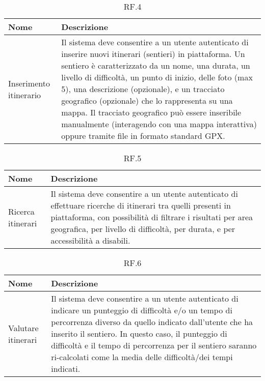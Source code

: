\documentclass{natourDoc}
\begin{document}
	\begin{table}[H]
		\centering
		\begin{tabular}{ |p{5cm}|p{10.3cm}| } 
			\hline
			\rowcolor{PineGreen!70}
			\textbf{Nome} & \textbf{Descrizione} \\
			\hline
			Inserimento itinerario &  Il sistema deve consentire a un utente autenticato di inserire nuovi itinerari (sentieri) in piattaforma. Un sentiero è
			caratterizzato da un nome, una durata, un livello di difficoltà, un punto di inizio, delle foto (max 5), una descrizione
			(opzionale), e un tracciato geografico (opzionale) che lo rappresenta su una mappa. Il tracciato
			geografico può essere inseribile manualmente (interagendo con una mappa interattiva) oppure
			tramite file in formato standard GPX.\\ 
			\hline
		\end{tabular}
		\caption{RF.4}
		\label{table:4}
	\end{table}
	
	\begin{table}[H]
		\centering
		\begin{tabular}{ |p{5cm}|p{10.3cm}| } 
			\hline
			\rowcolor{PineGreen!70}
			\textbf{Nome} & \textbf{Descrizione} \\
			\hline
			Ricerca itinerari &  Il sistema deve consentire a un utente autenticato di effettuare ricerche di itinerari tra quelli presenti in piattaforma, con possibilità di filtrare i risultati
			per area geografica, per livello di difficoltà, per durata, e per accessibilità a disabili.\\ 
			\hline
		\end{tabular}
		\caption{RF.5}
		\label{table:5}
	\end{table}
	
	\begin{table}[H]
		\centering
		\begin{tabular}{ |p{5cm}|p{10.3cm}| } 
			\hline
			\rowcolor{PineGreen!70}
			\textbf{Nome} & \textbf{Descrizione} \\
			\hline
			Valutare itinerari & Il sistema deve consentire a un utente autenticato di indicare un punteggio di difficoltà e/o un tempo
			di percorrenza diverso da quello indicato dall’utente che ha inserito il sentiero. In questo caso, il
			punteggio di difficoltà e il tempo di percorrenza per il sentiero saranno ri-calcolati come la media
			delle difficoltà/dei tempi indicati.\\ 
			\hline
		\end{tabular}
		\caption{RF.6}
		\label{table:6}
	\end{table}
	
\end{document}

